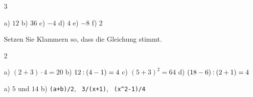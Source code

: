 \documentclass[11pt]{exam}
\begin{document}
\begin{questions}
\begin{multicols}{3}
\end{multicols}
\begin{solution}
  a) $12$ \quad b) $36$ \quad c) $-4$ \quad d) $4$ \quad e) $-8$ \quad f) $2$
\end{solution}
\raum{3cm}

\question Setzen Sie Klammern so, dass die Gleichung stimmt.
\begin{multicols}{2}
\end{multicols}
\begin{solution}
  a) $(2 + 3) \cdot 4 = 20$ \quad
  b) $12 \mathbin{:} (4 - 1) = 4$ \quad
  c) $(5 + 3)^2 = 64$ \quad
  d) $(18 - 6) \mathbin{:} (2 + 1) = 4$
\end{solution}
\raum{3cm}

\question
{}
\begin{solution}
  a) $5$ und $14$ \quad
  b) \texttt{(a+b)/2}, \ \texttt{3/(x+1)}, \ \texttt{(x\^{}2-1)/4}
\end{solution}
\raum{3cm}


\end{questions}
\end{document}
